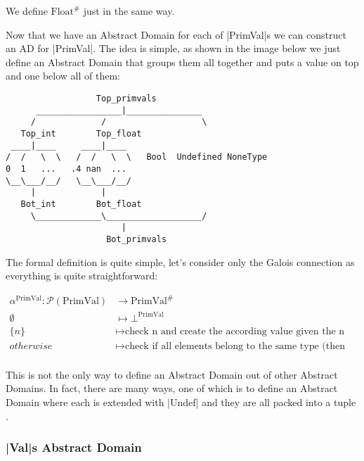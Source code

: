 We define \(\text{Float}^{\#}\) just in the same way.

Now that we have an Abstract Domain for each of \pycode|PrimVal|s we can
construct an AD for \pycode|PrimVal|. The idea is simple, as shown in
the image below we just define an Abstract Domain that groups them all
together and puts a value on top and one below all of them:


\begin{verbatim}
                  Top_primvals
      _________________|_______________
     /             /                   \
   Top_int        Top_float
 ____|____     ____|____
/  /   \  \   /  /   \  \   Bool  Undefined NoneType
0  1   ...   .4 nan  ...
\__\___/__/   \__\___/__/
     |             |
   Bot_int        Bot_float
     \_____________\___________________/
                       |
                    Bot_primvals
\end{verbatim}

The formal definition is quite simple, let's consider only the Galois
connection as everything is quite straightforward:


\begin{align*}
  \alpha^{\text{PrimVal}} \colon \mathcal{P}(\text{PrimVal}) &\to \text{PrimVal}^{\#} \\
  \emptyset &\mapsto \bot^{\text{PrimVal}} \\
  \{n\} &\mapsto \text{check n and create the according value given the n type} \\
  otherwise &\mapsto \text{check if all elements belong to the same type (then same alpha)
  otherwise Top primval} \\
\end{align*}

This is not the only way to define an Abstract Domain out of other
Abstract Domains. In fact, there are many ways, one of which is to define
an Abstract Domain where each is extended with \pycode|Undef| and they
are all packed into a tuple \autocite{fromherz_static_2018}.


\subsubsection*{\texorpdfstring{\pycode|Val|s Abstract
Domain}{Vals Abstract Domain}}\label{vals-abstract-domain}

